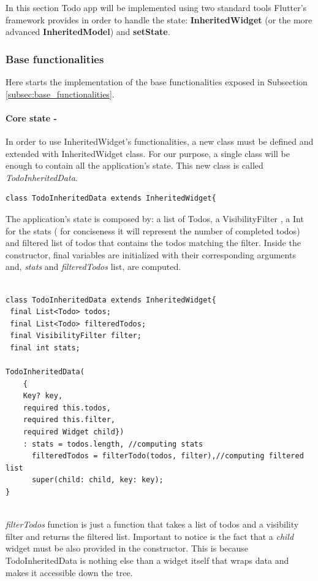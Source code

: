In this section Todo app will be implemented using two standard tools Flutter’s framework provides in order to handle the	 state: \textbf{InheritedWidget} (or the more advanced \textbf{InheritedModel}) and \textbf{setState}.

\subsubsection{Base functionalities} 
\label{par:todo_app_inherited_widget_base_app}
Here starts the implementation of the base functionalities exposed in Subsection \ref{subsec:base_functionalities}.
\paragraph{Core state - }
\label{subpar:todo_app_inherited_widget_core_state}
In order to use InheritedWidget's functionalities, a new class must be defined and extended with InheritedWidget class. For our purpose, a single class will be enough to contain all the application's state. This new class is called \textit{TodoInheritedData}.
\begin{code}
\mbox{}
 \mbox{}
		\label{code:2.14}
\begin{verbatim}
class TodoInheritedData extends InheritedWidget{
\end{verbatim}
\mbox{}
\end{code}

The application's state is composed by: a list of Todos, a VisibilityFilter , a Int for the stats ( for conciseness it will represent the number of completed todos) and filtered list of todos that contains the todos matching the filter. Inside the constructor, final variables are initialized with their corresponding arguments and, \textit{stats} and \textit{filteredTodos} list, are computed. 
\mbox{}\\
\begin{code}
\mbox{}
\label{code:2.15}
\begin{verbatim}

class TodoInheritedData extends InheritedWidget{
 final List<Todo> todos;
 final List<Todo> filteredTodos;
 final VisibilityFilter filter;
 final int stats;
 
TodoInheritedData(
    { 
    Key? key,
    required this.todos,
    required this.filter,
    required Widget child})
    : stats = todos.length, //computing stats
      filteredTodos = filterTodo(todos, filter),//computing filtered list
      super(child: child, key: key);
}
\end{verbatim}
\end{code}
\mbox{}\\
\textit{filterTodos} function is just a function that takes a list of todos and a visibility filter and returns the filtered list. Important to notice is the fact that a \textit{child} widget must be also provided in the constructor. This is because TodoInheritedData is nothing else than a widget itself that wraps data and makes it accessible down the tree.

